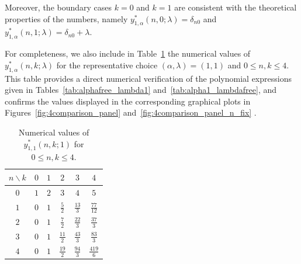 \documentclass{amsart}
\numberwithin{equation}{section}
\theoremstyle{definition}
\theoremstyle{remark}
\begin{document}
Moreover, the boundary cases $k=0$ and $k=1$ are consistent with the theoretical
properties of the numbers, namely
$y_{1,\alpha}^{*}(n,0;\lambda)=\delta_{n0}$ and
$y_{1,\alpha}^{*}(n,1;\lambda)=\delta_{n0}+\lambda$.


%
For completeness, we also include in Table~\ref{tab:alpha1_lambda1}
the numerical values of $y_{1,\alpha}^{*}(n,k;\lambda)$ for the representative
choice $(\alpha,\lambda)=(1,1)$ and $0 \le n,k \le 4$.
This table provides a direct numerical verification of the polynomial
expressions given in Tables~\ref{tab:alphafree_lambda1}
and~\ref{tab:alpha1_lambdafree}, and confirms the values displayed in the
corresponding graphical plots in Figures~\ref{fig:4comparison_panel} and~\ref{fig:4comparison_panel_n_fix} .

\begin{table}[htbp]
\centering
\footnotesize
\setlength{\tabcolsep}{10pt} %
\renewcommand{\arraystretch}{1.6} %
\begin{tabular}{|c|ccccc|}
\hline
$n\backslash k$ & $0$ & $1$ & $2$ & $3$ & $4$ \\ \hline
$0$ & $1$ & $2$ & $3$ & $4$ & $5$ \\
$1$ & $0$ & $1$ & $\frac{5}{2}$ & $\frac{13}{3}$ & $\frac{77}{12}$ \\
$2$ & $0$ & $1$ & $\frac{7}{2}$ & $\frac{22}{3}$ & $\frac{37}{3}$ \\
$3$ & $0$ & $1$ & $\frac{11}{2}$ & $\frac{43}{3}$ & $\frac{83}{3}$ \\
$4$ & $0$ & $1$ & $\frac{19}{2}$ & $\frac{94}{3}$ & $\frac{419}{6}$\\
\hline
\end{tabular}
\caption{Numerical values of $y_{1,1}^{*}(n,k;1)$ for $0\le n,k\le4$.}
\label{tab:alpha1_lambda1}
\end{table}
\FloatBarrier
\end{document}
